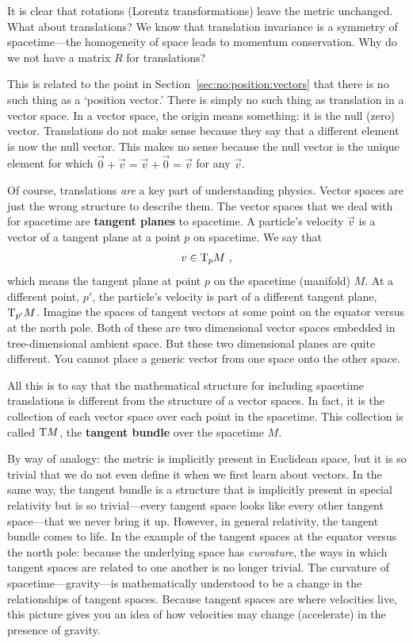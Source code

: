 \documentclass[12pt, oneside]{report}    %
\begin{document}
\begin{example}
It is clear that rotations (Lorentz transformations) leave the metric unchanged. What about translations? We know that translation invariance is a symmetry of spacetime---the homogeneity of space leads to momentum conservation. Why do we not have a matrix $R$ for translations?

This is related to the point in Section~\ref{sec:no:position:vectors} that there is no such thing as a `position vector.' There is simply no such thing as translation in a vector space. In a vector space, the origin means something: it is the null (zero) vector. Translations do not make sense because they say that a different element is now the null vector. This makes no sense because the null vector is the unique element for which $\vec{0}+\vec{v} = \vec{v} + \vec{0} = \vec{v}$ for any $\vec{v}$. 

Of course, translations \emph{are} a key part of understanding physics. Vector spaces are just the wrong structure to describe them. The vector spaces that we deal with for spacetime are \textbf{tangent planes} to spacetime. A particle's velocity $\vec{v}$ is a vector of a tangent plane at a point $p$ on spacetime. We say that
\begin{align}
    v\in \textnormal{T}_p{M} \ ,
\end{align}
which means the tangent plane at point $p$ on the spacetime (manifold) $M$. At a different point, $p'$, the particle's velocity is part of a different tangent plane, $\textnormal{T}_{p'}M$. Imagine the spaces of tangent vectors at some point on the equator versus at the north pole. Both of these are two dimensional vector spaces embedded in tree-dimensional ambient space. But these two dimensional planes are quite different. You cannot place a generic vector from one space onto the other space. 

All this is to say that the mathematical structure for including spacetime translations is different from the structure of a vector spaces. In fact, it is the collection of each vector space over each point in the spacetime. This collection is called $\textnormal{T}M$, the \textbf{tangent bundle} over the spacetime $M$. 

By way of analogy: the metric is implicitly present in Euclidean space, but it is so trivial that we do not even define it when we first learn about vectors. In the same way, the tangent bundle is a structure that is implicitly present in special relativity but is so trivial---every tangent space looks like every other tangent space---that we never bring it up. However, in general relativity, the tangent bundle comes to life. In the example of the tangent spaces at the equator versus the north pole: because the underlying space has \emph{curvature}, the ways in which tangent spaces are related to one another is no longer trivial. The curvature of spacetime---gravity---is mathematically understood to be a change in the relationships of tangent spaces. Because tangent spaces are where velocities live, this picture gives you an idea of how velocities may change (accelerate) in the presence of gravity.


\end{example}
\end{document}
